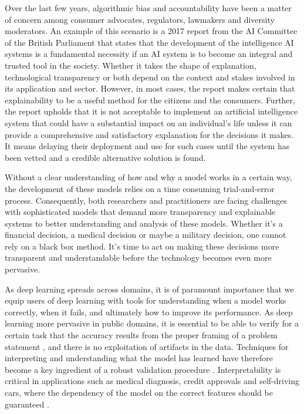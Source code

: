 Over the last few years, algorithmic bias and accountability have been a matter of concern among consumer advocates, regulators, lawmakers and diversity moderators. An example of this scenario is a 2017 report from the AI Committee of the British Parliament \cite{Hagras2018} that states that the development of the intelligence AI systems is a fundamental necessity if an AI system is to become an integral and trusted tool in the society. Whether it takes the shape of explanation, technological transparency or both depend on the context and stakes involved in its application and sector. However, in most cases, the report makes certain that explainability to be a useful method for the citizens and the consumers. 
Further, the report upholds that it is not acceptable to implement an artificial intelligence system that could have a substantial impact on an individual's life unless it can provide a comprehensive and satisfactory explanation for the decisions it makes. It means delaying their deployment and use for such cases until the system has been vetted and a credible alternative solution is found.

Without a clear understanding of how and why a model works in a certain way, the development of these models relies on a time consuming trial-and-error process. Consequently, both researchers and practitioners are facing challenges with sophisticated models that demand more transparency and explainable systems to better understanding and analysis of these models. Whether it's a financial decision, a medical decision or maybe a military decision, one cannot rely on a black box method. It's time to act on making these decisions more transparent and understandable before the technology becomes even more pervasive.

As deep learning spreads across domains, it is of paramount importance that we equip users of deep learning with tools for understanding when a model works correctly, when it fails, and ultimately how to improve its performance. As deep learning more pervasive in public domains, it is essential to be able to verify for a certain task that the accuracy results from the proper framing of a problem statement \cite{Liu2017}, and there is no exploitation of artifacts in the data. Techniques for interpreting and understanding what the model has learned have therefore become a key ingredient of a robust validation procedure \cite{taylor2006methods} \cite{hansen2011visual} \cite{bach2015pixel}. Interpretability is critical in applications such as medical diagnosis, credit approvals and self-driving cars, where the dependency of the model on the correct features should be guaranteed \cite{Caruana:2015:IMH:2783258.2788613} \cite{bojarski2017explaining}.

